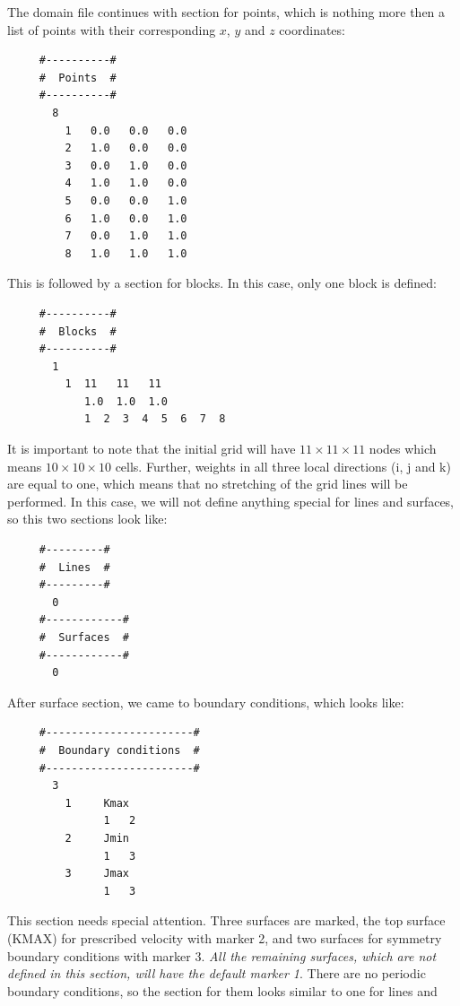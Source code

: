 \documentclass[10pt]{article}
\newcommand*{\tc}{\ttfamily} %
\begin{document}
     The domain file continues with
     section for points, which is nothing more then a list of
     points with their corresponding $x$, $y$ and $z$ coordinates:
     \small
     \begin{verbatim}
     #----------#
     #  Points  #
     #----------#
       8
         1   0.0   0.0   0.0
         2   1.0   0.0   0.0
         3   0.0   1.0   0.0
         4   1.0   1.0   0.0
         5   0.0   0.0   1.0
         6   1.0   0.0   1.0
         7   0.0   1.0   1.0
         8   1.0   1.0   1.0
     \end{verbatim}
     \normalsize
     This is followed by a section for blocks. In this case,
     only one block is defined:
     \small
     \begin{verbatim}
     #----------#
     #  Blocks  #
     #----------#
       1
         1  11   11   11
            1.0  1.0  1.0
            1  2  3  4  5  6  7  8
     \end{verbatim}
     \normalsize
     It is important to note that the initial grid will 
     have $11 \times 11 \times 11$ nodes which means 
     $10 \times 10 \times 10$ cells. Further, weights
     in all three local directions (i, j and k) are 
     equal to one, which means that no stretching of the
     grid lines will be performed. 
     In this case, we will not define anything special for
     lines and surfaces, so this two sections look like:
     \small
     \begin{verbatim}
     #---------#
     #  Lines  #
     #---------#
       0
     #------------#
     #  Surfaces  #
     #------------#
       0
     \end{verbatim}
     \normalsize
     After surface section, we came to boundary conditions,
     which looks like:
     \small
     \begin{verbatim}
     #-----------------------#
     #  Boundary conditions  #
     #-----------------------#
       3
         1     Kmax
               1   2
         2     Jmin
               1   3
         3     Jmax
               1   3
     \end{verbatim}
     \normalsize
    This section needs special attention. Three surfaces are 
    marked, the top surface ({\tc KMAX}) for prescribed velocity
    with marker 2, and two surfaces for symmetry boundary
    conditions with marker 3. {\em All the remaining surfaces,
    which are not defined in this section, will have the 
    default marker 1}. 
    There are no periodic boundary conditions, so the 
    section for them looks similar to one for lines and
\end{document}
